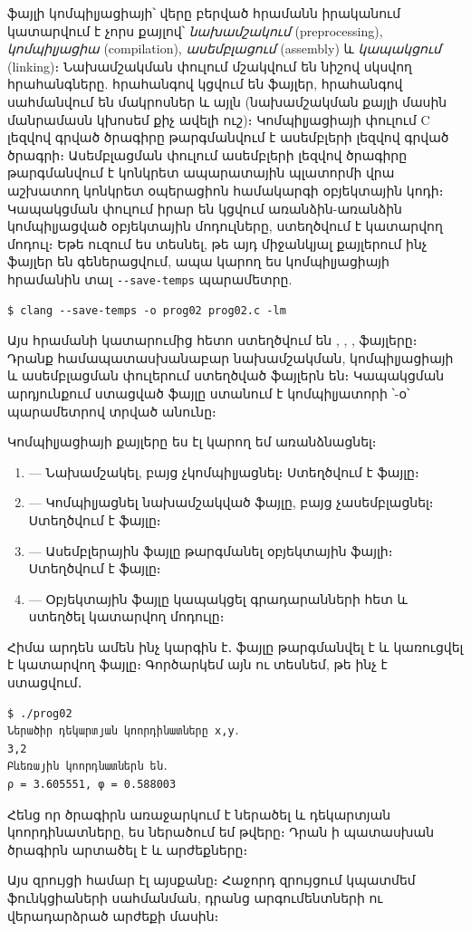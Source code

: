  ֆայլի կոմպիլյացիայի՝ վերը բերված հրամանն իրականում
կատարվում է չորս քայլով՝ \emph{նախամշակում} (preprocessing),
\emph{կոմպիլյացիա} (compilation), \emph{ասեմբլացում} (assembly) և
\emph{կապակցում} (linking)։ Նախամշակման փուլում մշակվում են \code{\#}
նիշով սկսվող հրահանգները.  հրահանգով կցվում են ֆայլեր,
 հրահանգով սահմանվում են մակրոսներ և այլն (նախամշակման
քայլի մասին մանրամասն կխոսեմ քիչ ավելի ուշ)։ Կոմպիլյացիայի փուլում C
լեզվով գրված ծրագիրը թարգմանվում է ասեմբլերի լեզվով գրված ծրագրի։
Ասեմբլացման փուլում ասեմբլերի լեզվով ծրագիրը թարգմանվում է կոնկրետ
ապարատային պլատորմի վրա աշխատող կոնկրետ օպերացիոն համակարգի օբյեկտային
կոդի։ Կապակցման փուլում իրար են կցվում առանձին-առանձին կոմպիլյացված
օբյեկտային մոդուլները, ստեղծվում է կատարվող մոդուլ։ Եթե ուզում ես
տեսնել, թե այդ միջանկյալ քայլերում ինչ ֆայլեր են գեներացվում, ապա կարող
ես կոմպիլյացիայի հրամանին տալ \verb|--save-temps| պարամետրը.

\begin{verbatim}
$ clang --save-temps -o prog02 prog02.c -lm
\end{verbatim}

Այս հրամանի կատարումից հետո ստեղծվում են ,
, ,  ֆայլերը։ Դրանք
համապատասխանաբար նախամշակման, կոմպիլյացիայի և ասեմբլացման փուլերում
ստեղծված ֆայլերն են։ Կապակցման արդյունքում ստացված ֆայլը ստանում է
կոմպիլյատորի ՝-օ՝ պարամետրով տրված անունը։

Կոմպիլյացիայի քայլերը ես էլ կարող եմ առանձնացնել։

\begin{enumerate}
\item {} --- Նախամշակել, բայց
  չկոմպիլյացնել։ Ստեղծվում է  ֆայլը։
\item {} --- Կոմպիլյացնել նախամշակված
  ֆայլը, բայց չասեմբլացնել։ Ստեղծվում է  ֆայլը։
\item {} --- Ասեմբլերային ֆայլը
  թարգմանել օբյեկտային ֆայլի։ Ստեղծվում է  ֆայլը։
\item {} --- Օբյեկտային ֆայլը կապակցել
  գրադարանների հետ և ստեղծել  կատարվող մոդուլը։
\end{enumerate}

Հիմա արդեն ամեն ինչ կարգին է․ ֆայլը թարգմանվել է և կառուցվել է
 կատարվող ֆայլը։ Գործարկեմ այն ու տեսնեմ, թե ինչ է
ստացվում․

\begin{verbatim}
$ ./prog02
Ներածիր դեկարտյան կոորդինատները x,y․
3,2
Բևեռային կոորդնատներն են․
ρ = 3.605551, φ = 0.588003
\end{verbatim}

Հենց որ ծրագիրն առաջարկում է ներածել  և  դեկարտյան
կոորդինատները, ես ներածում եմ  թվերը։ Դրան ի պատասխան
ծրագիրն արտածել է  և 
արժեքները։

Այս զրույցի համար էլ այսքանը։ Հաջորդ զրույցում կպատմեմ ֆունկցիաների
սահմանման, դրանց արգումենտների ու վերադարձրած արժեքի մասին։
